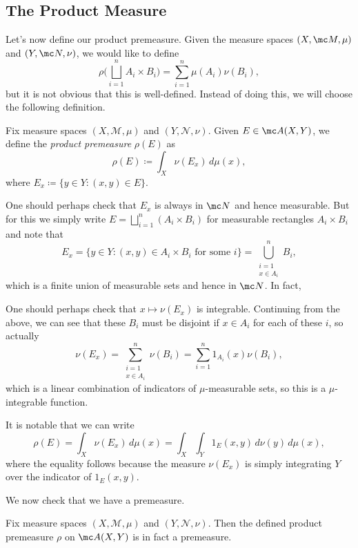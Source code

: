 \documentclass[../notes.tex]{subfiles}
\begin{document}
\subsection{The Product Measure}
Let's now define our product premeasure. Given the measure spaces $(X,\mc M,\mu)$ and $(Y,\mc N,\nu)$, we would like to define
\[\rho\Bigg(\bigsqcup_{i=1}^nA_i\times B_i\Bigg)=\sum_{i=1}^n\mu(A_i)\nu(B_i),\]
but it is not obvious that this is well-defined. Instead of doing this, we will choose the following definition.
\begin{definition} \label{def:product-premeas}
	Fix measure spaces $(X,\mathcal M,\mu)$ and $(Y,\mathcal N,\nu)$. Given $E\in\mc A(X,Y)$, we define the \textit{product premeasure} $\rho(E)$ as
	\[\rho(E)\coloneqq\int_X\nu(E_x)\,d\mu(x),\]
	where $E_x\coloneqq\{y\in Y:(x,y)\in E\}$.
\end{definition}
\begin{remark}
	One should perhaps check that $E_x$ is always in $\mc N$ and hence measurable. But for this we simply write $E=\bigsqcup_{i=1}^n(A_i\times B_i)$ for measurable rectangles $A_i\times B_i$ and note that
	\[E_x=\{y\in Y:(x,y)\in A_i\times B_i\text{ for some }i\}=\bigcup_{\substack{i=1\\x\in A_i}}^nB_i,\]
	which is a finite union of measurable sets and hence in $\mc N$. In fact, 
\end{remark}
\begin{remark}
	One should perhaps check that $x\mapsto\nu(E_x)$ is integrable. Continuing from the above, we can see that these $B_i$ must be disjoint if $x\in A_i$ for each of these $i$, so actually
	\[\nu(E_x)=\sum_{\substack{i=1\\x\in A_i}}^n\nu(B_i)=\sum_{i=1}^n1_{A_i}(x)\nu(B_i),\]
	which is a linear combination of indicators of $\mu$-measurable sets, so this is a $\mu$-integrable function.
\end{remark}
\begin{remark} \label{rem:double-int-premeasure}
	It is notable that we can write
	\[\rho(E)=\int_X\nu(E_x)\,d\mu(x)=\int_X\int_Y1_{E}(x,y)\,d\nu(y)\,d\mu(x),\]
	where the equality follows because the measure $\nu(E_x)$ is simply integrating $Y$ over the indicator of $1_E(x,y)$.
\end{remark}
We now check that we have a premeasure.
\begin{proposition}
	Fix measure spaces $(X,\mathcal M,\mu)$ and $(Y,\mathcal N,\nu)$. Then the defined product premeasure $\rho$ on $\mc A(X,Y)$ is in fact a premeasure.
\end{proposition}
\end{document}
